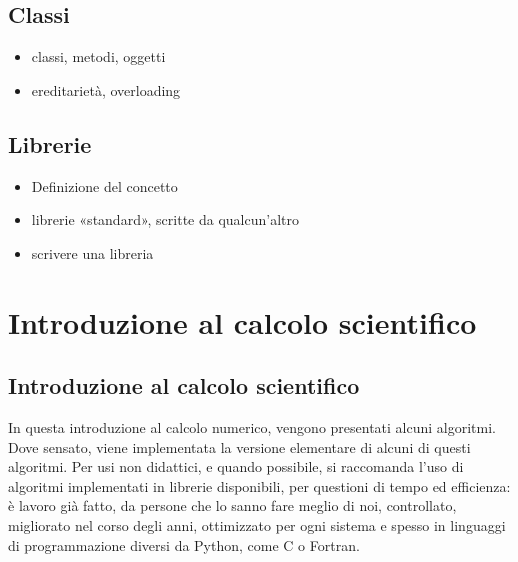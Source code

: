 \documentclass[letterpaper,10pt,italian]{jupyterBook}
\begin{document}
\chapter{Classi}
\label{\detokenize{ch/programming/oo:classi}}\label{\detokenize{ch/programming/oo::doc}}\begin{itemize}
\item {} 
\sphinxAtStartPar
classi, metodi, oggetti

\item {} 
\sphinxAtStartPar
ereditarietà, overloading

\end{itemize}

\sphinxstepscope


\chapter{Librerie}
\label{\detokenize{ch/programming/libraries:librerie}}\label{\detokenize{ch/programming/libraries::doc}}\begin{itemize}
\item {} 
\sphinxAtStartPar
Definizione del concetto

\item {} 
\sphinxAtStartPar
librerie «standard», scritte da qualcun’altro

\item {} 
\sphinxAtStartPar
scrivere una libreria

\end{itemize}

\sphinxstepscope


\part{Introduzione al calcolo scientifico}

\sphinxstepscope


\chapter{Introduzione al calcolo scientifico}
\label{\detokenize{ch/numerics:introduzione-al-calcolo-scientifico}}\label{\detokenize{ch/numerics:book-numerics-hs}}\label{\detokenize{ch/numerics::doc}}
\sphinxAtStartPar
In questa introduzione al calcolo numerico, vengono presentati alcuni algoritmi. Dove sensato, viene implementata la versione elementare di alcuni di questi algoritmi. Per usi non didattici, e quando possibile, si raccomanda l’uso di algoritmi implementati in librerie disponibili, per questioni di tempo ed efficienza: è lavoro già fatto, da persone che lo sanno fare meglio di noi, controllato, migliorato nel corso degli anni, ottimizzato per ogni sistema e spesso in linguaggi di programmazione diversi da Python, come C o Fortran.
\end{document}
